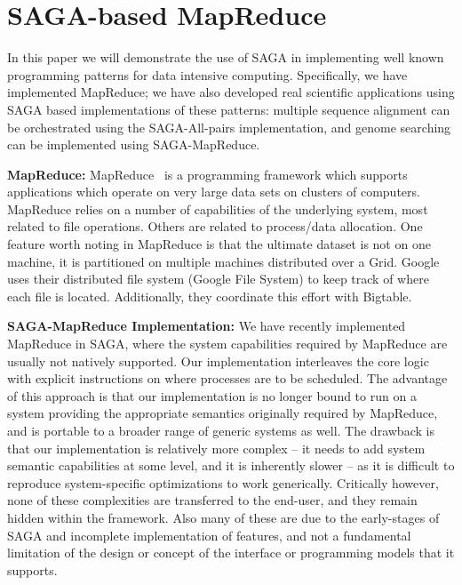\documentclass[conference,final]{IEEEtran}
\begin{document}
\section{SAGA-based MapReduce}

In this paper we will demonstrate the use of SAGA in implementing well
known programming patterns for data intensive computing.
Specifically, we have implemented MapReduce; we have also developed
real scientific applications using SAGA based implementations of these
patterns: multiple sequence alignment can be orchestrated using the
SAGA-All-pairs implementation, and genome searching can be implemented
using SAGA-MapReduce.

{\bf MapReduce:} MapReduce~\cite{mapreduce-paper} is a programming
framework which supports applications which operate on very large data
sets on clusters of computers.  MapReduce relies on a number of
capabilities of the underlying system, most related to file
operations.  Others are related to process/data
allocation. %
One feature worth noting in MapReduce is that the ultimate dataset is
not on one machine, it is partitioned on multiple machines distributed
over a Grid. Google uses their distributed file system (Google File
System) to keep track of where each file is located.  Additionally,
they coordinate this effort with Bigtable.

{\bf SAGA-MapReduce Implementation:} We have recently implemented
MapReduce in SAGA, where the system capabilities required by MapReduce
are usually not natively supported. Our implementation interleaves the
core logic with explicit instructions on where processes are to be
scheduled.  The advantage of this approach is that our implementation
is no longer bound to run on a system providing the appropriate
semantics originally required by MapReduce, and is portable to a
broader range of generic systems as well.  The drawback is that our
implementation is relatively more complex -- it needs to add system
semantic capabilities at some level, and it is inherently slower -- as
it is difficult to reproduce system-specific optimizations to work
generically.
Critically however, none of these complexities are transferred to the
end-user, and they remain hidden within the framework. Also many of
these are due to the early-stages of SAGA and incomplete
implementation of features, and not a fundamental limitation of the
design or concept of the interface or programming models that it
supports.
\end{document}
